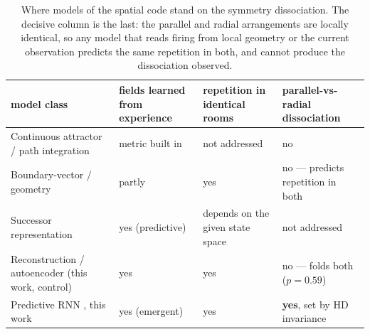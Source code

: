 \documentclass[9pt,lineno]{elife}
\begin{document}
\begin{table}[t]
\centering
\small
\setlength{\tabcolsep}{4pt}
\caption{Where models of the spatial code stand on the symmetry dissociation. The decisive column
is the last: the parallel and radial arrangements are locally identical, so any model that reads
firing from local geometry or the current observation predicts the same repetition in both, and
cannot produce the dissociation \citet{grieves2016} observed.}
\label{tab:models}
\begin{tabular}{p{}p{}p{}p{}}
\toprule
model class & fields learned from experience & repetition in identical rooms &
parallel-vs-radial dissociation \\
\midrule
Continuous attractor / path integration \citep{burak2009, sorscher2023unified}
& metric built in & not addressed & no \\[3pt]
Boundary-vector / geometry \citep{hartley2000}
& partly & yes & no --- predicts repetition in both \\[3pt]
Successor representation \citep{stachenfeld2017}
& yes (predictive) & depends on the given state space & not addressed \\[3pt]
Reconstruction / autoencoder (this work, control)
& yes & yes & no --- folds both ($p=0.59$) \\[3pt]
Predictive RNN \citep{levenstein2024}, this work
& yes (emergent) & yes & \textbf{yes}, set by HD invariance \\
\bottomrule
\end{tabular}
\end{table}
\end{document}
